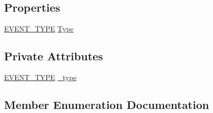 \subsection*{Properties}
\begin{DoxyCompactItemize}
\item 
\hyperlink{class_web_analyzer_1_1_events_1_1_testrun_event_a97dd88675eb3148f11919cc7e40d1850}{E\+V\+E\+N\+T\+\_\+\+T\+Y\+P\+E} \hyperlink{class_web_analyzer_1_1_events_1_1_testrun_event_a2b00817b90c600d38c12f6dc1e1ebc3c}{Type}
\end{DoxyCompactItemize}
\subsection*{Private Attributes}
\begin{DoxyCompactItemize}
\item 
\hyperlink{class_web_analyzer_1_1_events_1_1_testrun_event_a97dd88675eb3148f11919cc7e40d1850}{E\+V\+E\+N\+T\+\_\+\+T\+Y\+P\+E} \hyperlink{class_web_analyzer_1_1_events_1_1_testrun_event_af73ff30ca9c4d62fd7367af9005fce2e}{\+\_\+type}
\end{DoxyCompactItemize}


\subsection{Member Enumeration Documentation}
\hypertarget{class_web_analyzer_1_1_events_1_1_testrun_event_a97dd88675eb3148f11919cc7e40d1850}{}
